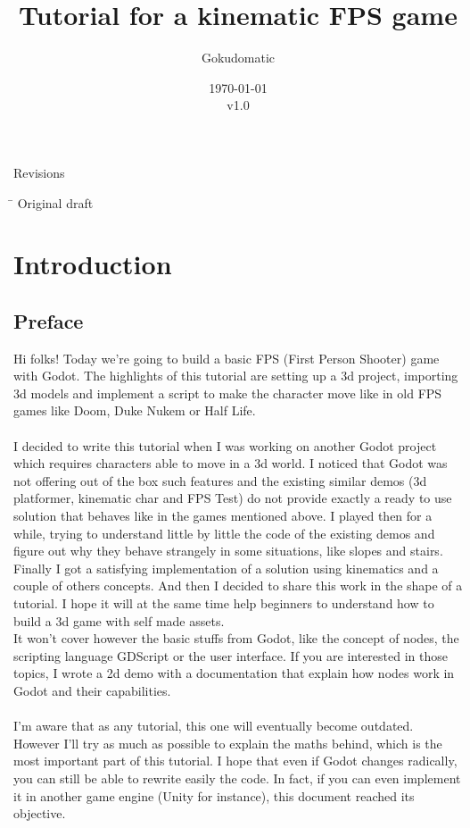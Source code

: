 \documentclass[10pt,a4paper]{article}
\author{Gokudomatic}
\title{Tutorial for a kinematic FPS game}
\date{\today\\v1.0}
\begin{document}
\maketitle

\clearpage

\begin{center}
{\Large Revisions}
\begin{tabbing}
\hspace{1cm} \=  \> Original draft
\end{tabbing}
\end{center}

\clearpage

\tableofcontents

\clearpage

\section{Introduction}

\subsection{Preface}
Hi folks! 
Today we're going to build a basic FPS (First Person Shooter) game with Godot. The highlights of this tutorial are setting up a 3d project, importing 3d models and implement a script to make the character move like in old FPS games like Doom\cite{doom}, Duke Nukem or Half Life.\\
\\
I decided to write this tutorial when I was working on another Godot project which requires characters able to move in a 3d world. I noticed that Godot was not offering out of the box such features and the existing similar demos (3d platformer, kinematic char and FPS Test) do not provide exactly a ready to use solution that behaves like in the games mentioned above. I played then for a while, trying to understand little by little the code of the existing demos and figure out why they behave strangely in some situations, like slopes and stairs. Finally I got a satisfying implementation of a solution using kinematics and a couple of others concepts. And then I decided to share this work in the shape of a tutorial. I hope it will at the same time help beginners to understand how to build a 3d game with self made assets.\\
It won't cover however the basic stuffs from Godot, like the concept of nodes, the scripting language GDScript or the user interface. If you are interested in those topics, I wrote a 2d demo\cite{fox2d} with a documentation that explain how nodes work in Godot and their capabilities.\\
\\
I'm aware that as any tutorial, this one will eventually become outdated. However I'll try as much as possible to explain the maths behind, which is the most important part of this tutorial. I hope that even if Godot changes radically, you can still be able to rewrite easily the code. In fact, if you can even implement it in another game engine (Unity for instance), this document reached its objective.
\end{document}
